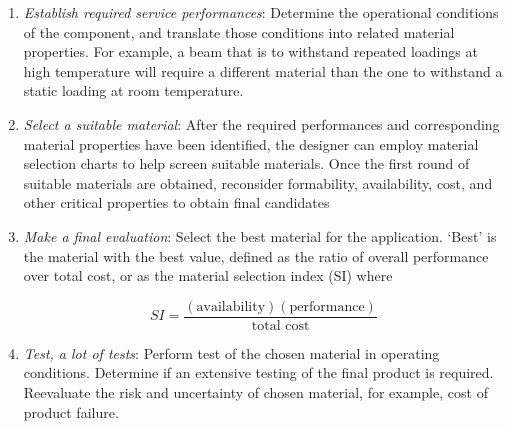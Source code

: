 \documentclass[
10pt,
a4paper,
openany,
svgnames,
]{book}
\begin{document}
\begin{enumerate}

\item \emph{Establish required service performances}: Determine the operational conditions of the component, and translate those conditions into related material properties. For example, a beam that is to withstand repeated loadings at high temperature will require a different material than the one to withstand a static loading at room temperature.

\item \emph{Select a suitable material}: After the required performances and corresponding material properties have been identified, the designer can employ material selection charts to help screen suitable materials. Once the first round of suitable materials are obtained, reconsider formability, availability, cost, and other critical properties to obtain final candidates

\item \emph{Make a final evaluation}: Select the best material for the application. ‘Best’ is the material with the best value, defined as the ratio of overall performance over total cost, or as the material selection index (SI) where

  $$ SI = \frac{(\text{availability})(\text{performance})}{\text{total cost}} $$

\item \emph{Test, a lot of tests}: Perform test of the chosen material in operating conditions. Determine if an extensive testing of the final product is required. Reevaluate the risk and uncertainty of chosen material, for example, cost of product failure.

\end{enumerate}
\end{document}
